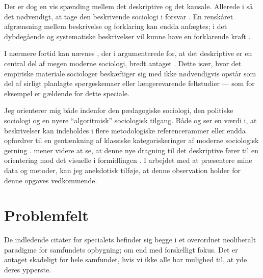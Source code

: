 Der er dog en vis spænding mellem det deskriptive og det kausale.
Allerede i \citeyear{sjobergRationaleDescriptiveSociology1951} så \citeauthor{sjobergRationaleDescriptiveSociology1951} det nødvendigt, at tage den beskrivende sociologi i forsvar \autocite{sjobergRationaleDescriptiveSociology1951}.
En renskåret afgrænsning mellem beskrivelse og forklaring kan endda anfægtes; i det dybdegående og systematiske beskrivelser vil kunne have en forklarende kraft \autocite[s. 252]{sjobergRationaleDescriptiveSociology1951}.

I nærmere fortid kan nævnes \citeauthor{savageContemporarySociologyChallenge2009}, der i \citeyear{savageContemporarySociologyChallenge2009} argumenterede for, at det deskriptive er en central del af megen moderne sociologi, bredt antaget \autocite{savageContemporarySociologyChallenge2009}.
Dette især, hvor det empiriske materiale sociologer beskæftiger sig med ikke nødvendigvis opstår som del af sirligt planlagte spørgeskemaer eller længerevarende feltstudier \autocite[s. 157]{savageContemporarySociologyChallenge2009} — som for eksempel er gældende for dette speciale.

Jeg orienterer mig både indenfor den pædagogiske sociologi, den politiske sociologi og en nyere “algoritmisk” sociologisk tilgang.
Både \citeauthor{sjobergRationaleDescriptiveSociology1951} og \citeauthor{savageContemporarySociologyChallenge2009} ser en værdi i, at beskrivelser kan indeholdes i flere metodologiske referencerammer \autocite[s. 256]{sjobergRationaleDescriptiveSociology1951} eller endda opfordrer til en gentænkning af klassiske kategoriskeringer af moderne sociologisk gerning \autocite[s. 170]{savageContemporarySociologyChallenge2009}.
\citeauthor{savageContemporarySociologyChallenge2009} mener videre at se, at denne nye dragning til det deskriptive fører til en orientering mod det visuelle i formidlingen \autocite[s.169]{savageContemporarySociologyChallenge2009}.
I arbejdet med at præsentere mine data og metoder, kan jeg anekdotisk tilføje, at denne observation holder for denne opgaves vedkommende.

\chapter{Problemfelt}\label{sec:problem}

De indledende citater for specialets befinder sig begge i et overordnet neoliberalt paradigme for samfundets opbygning; om end med forskelligt fokus.
Det er antaget skadeligt for hele samfundet, hvis vi ikke alle har mulighed til, at yde deres ypperste.

